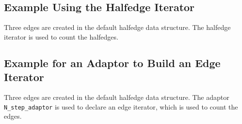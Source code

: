 \subsection{Example Using the Halfedge Iterator}

Three edges are created in the default halfedge data structure.
The halfedge iterator is used to count the halfedges.


\subsection{Example for an Adaptor to Build an Edge Iterator}

Three edges are created in the default halfedge data structure.
The adaptor {\tt N\_step\_adaptor} is used to declare an edge
iterator, which is used to count the edges.



